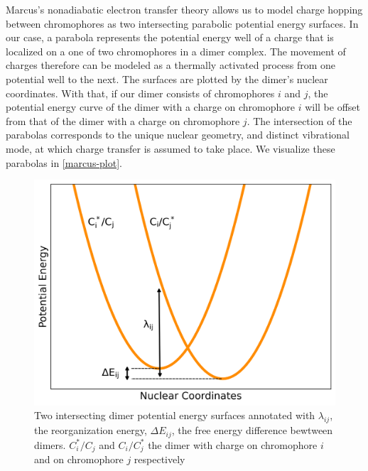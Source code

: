 Marcus's nonadiabatic electron transfer theory allows us to model charge hopping between chromophores as two
intersecting parabolic potential energy surfaces. 
In our case, a parabola represents the potential energy well of a charge that is localized on a 
one of two chromophores in a dimer complex. The movement of charges therefore can be modeled as a thermally
activated process from one potential well to the next.  The surfaces are plotted by 
the dimer's nuclear coordinates. 
With that, if our dimer consists of chromophores $i$ and $j$, the potential energy curve of the dimer with a
charge on chromophore $i$ will be offset from that of the dimer with a charge on chromophore $j$. The
intersection of the parabolas corresponds to the unique nuclear geometry, and distinct vibrational mode, at
which charge transfer is assumed to take place. We visualize these parabolas in \autoref{marcus-plot}.
\begin{figure}
  \center
  \includegraphics[width=0.99\linewidth]{figures/marcus-plot.png} 
    \caption{Two intersecting dimer potential energy surfaces annotated with $\lambda_{ij}$, the
    reorganization energy, $\Delta E_{ij}$, the free energy difference bewtween dimers. $C_{i}^*/C_{j}$ 
    and $C_{i}/C_{j}^*$ the dimer with charge on chromophore $i$ and on chromophore $j$ respectively}
  \label{marcus-plot}
\end{figure}

